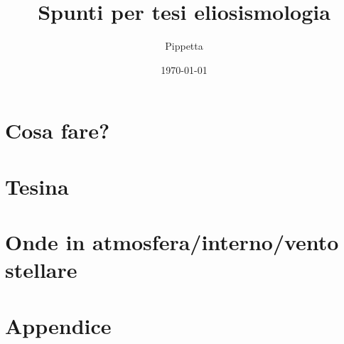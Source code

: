 \documentclass[oneside,12pt,fleqn]{memoir}
\author{Pippetta}
\title{Spunti per tesi eliosismologia}
\date{\today}
\begin{document}
\frontmatter

\maketitle

\tableofcontents*
\listoffigures

\mainmatter


\part{Cosa fare?}



\part{Tesina}








\part{Onde in atmosfera/interno/vento stellare}



\appendix
\part{Appendice}


\clearpage
{}
\printindex
\end{document}
